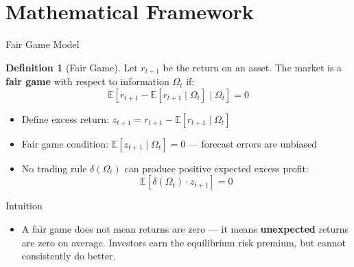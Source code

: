\documentclass[9pt, aspectratio=169, t]{beamer}
\theoremstyle{definition}
\newtheorem{defn}{Definition}
\newenvironment{cminipage}[1]{%
    \par\noindent\hfill\begin{minipage}{#1}\ignorespaces
}{%
    \end{minipage}\hfill\null\par
}
\newcommand{\E}{\mathbb{E}}
\begin{document}
\section{Mathematical Framework}

\begin{frame}{Fair Game Model}
\begin{cminipage}{0.95\textwidth}
\begin{defn}[Fair Game]
Let $r_{t+1}$ be the return on an asset. The market is a \textbf{fair game} with respect to information $\Omega_t$ if:
$$\E[r_{t+1} - \E[r_{t+1} \mid \Omega_t] \mid \Omega_t] = 0$$
\end{defn}

\begin{itemize}\setlength{\itemsep}{0pt}
    \item Define excess return: $z_{t+1} = r_{t+1} - \E[r_{t+1} \mid \Omega_t]$
    \item Fair game condition: $\E[z_{t+1} \mid \Omega_t] = 0$ --- forecast errors are unbiased
    \item No trading rule $\delta(\Omega_t)$ can produce positive expected excess profit:
    $$\E[\delta(\Omega_t) \cdot z_{t+1}] = 0$$
\end{itemize}

\begin{exampleblock}{Intuition}
\begin{itemize}\setlength{\itemsep}{0pt}
    \item A fair game does not mean returns are zero --- it means \textbf{unexpected} returns are zero on average. Investors earn the equilibrium risk premium, but cannot consistently do better.
\end{itemize}
\end{exampleblock}
\end{cminipage}
\end{frame}
\end{document}
